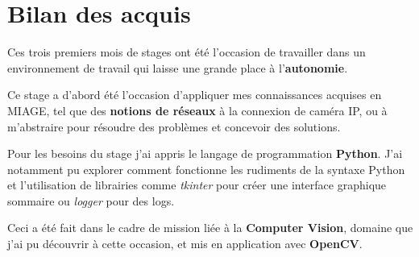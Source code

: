 \section{Bilan des acquis}

  Ces trois premiers mois de stages ont été l'occasion de travailler dans un environnement de travail qui laisse une grande place à l'\textbf{autonomie}. 

  Ce stage a d'abord été l'occasion d'appliquer mes connaissances acquises en MIAGE, tel que des \textbf{notions de réseaux} à la connexion de caméra IP, ou à m'abstraire pour résoudre des problèmes et concevoir des solutions. 

  Pour les besoins du stage j'ai appris le langage de programmation \textbf{Python}. J'ai notamment pu explorer comment fonctionne les rudiments de la syntaxe Python et l'utilisation de librairies comme \textit{tkinter} pour créer une interface graphique sommaire ou \textit{logger} pour des logs.

  Ceci a été fait dans le cadre de mission liée à la \textbf{Computer Vision}, domaine que j'ai pu découvrir à cette occasion, et mis en application avec \textbf{OpenCV}.